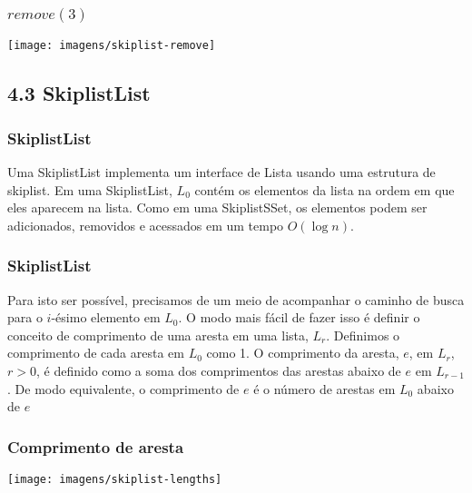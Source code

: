 \documentclass{beamer}
\begin{document}
\begin{frame}
\frametitle{$remove(3)$}
\texttt{[image: imagens/skiplist-remove]}
\end{frame}

\subsection{4.3 SkiplistList}
\begin{frame}
\frametitle{SkiplistList}
Uma SkiplistList implementa um interface de Lista usando uma estrutura de skiplist. Em uma SkiplistList, $L_0$ contém os elementos da lista na ordem em que eles aparecem na lista. Como em uma SkiplistSSet, os elementos podem ser adicionados, removidos e acessados em um tempo $O(\log n)$. 

\end{frame}

\begin{frame}
	\frametitle{SkiplistList}
	Para isto ser possível, precisamos de um meio de acompanhar o caminho de busca para o  $i$-ésimo elemento em $L_0$. O modo mais fácil de fazer isso é definir o conceito de comprimento de uma aresta em uma lista, $L_r$. Definimos o comprimento de cada aresta em  $L_{0}$ como 1. O comprimento da aresta, $e$, em $L_r$, $r>0$, é definido como a soma dos comprimentos das arestas abaixo de $ e$ em $L_{r-1}$. De modo equivalente, o comprimento de $ e$ é o número de arestas em $L_0$ abaixo de $ e$
\end{frame}

\begin{frame}
\frametitle{Comprimento de aresta}
\texttt{[image: imagens/skiplist-lengths]}
\end{frame}
\end{document}
